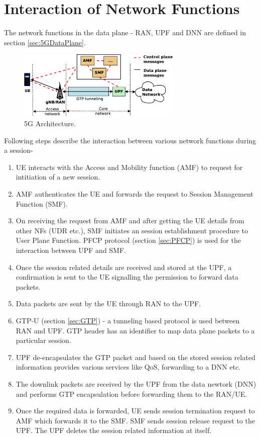 
\section{Interaction of Network Functions}
The network functions in the data plane - RAN, UPF and DNN are defined in section \ref{sec:5GDataPlane}.
\begin{figure}[htbp]
	\centering
       \includegraphics[width=0.7\textwidth]{fig/5g_arch.eps}
       \setlength{\belowcaptionskip}{-12pt}
	\caption{5G Architecture.}
	\label{fig:5g_arch}
       \end{figure}
Following steps describe the interaction between various network functions during a session-
\begin{enumerate}
	\item UE interacts with the Access and Mobility function (AMF) to request for intitiation of a new session.
	\item AMF authenticates the UE and forwards the request to Session Management Function (SMF).
	\item On receiving the request from AMF and after getting the UE details from other NFs (UDR etc.),
	SMF initiates an session establishment procedure to User Plane Function. PFCP protocol (section \ref{sec:PFCP}) is used for the interaction between 
	UPF and SMF.
	\item Once the session related details are received and stored at the UPF, a confirmation is sent to the 
	UE signalling the permission to forward data packets. 
	\item Data packets are sent by the UE through RAN to the UPF. 
	\item GTP-U (section \ref{sec:GTP}) - a tunneling based protocol is used between RAN and UPF. GTP header has an identifier to map data plane packets 
	to a particular session. 
	\item UPF de-encapsulates the GTP packet and based on the stored session 
	related information provides various services like QoS, forwarding to a DNN etc. 
	\item The downlink packets are received by the UPF from the data newtork (DNN) and performs GTP encapsulation before forwarding them to the RAN/UE.  	
	\item Once the required data is forwarded, UE sends session termination request to AMF which forwards it to the SMF. SMF sends session release request to the UPF. The UPF deletes the session related information  at itself. 
\end{enumerate}
 
